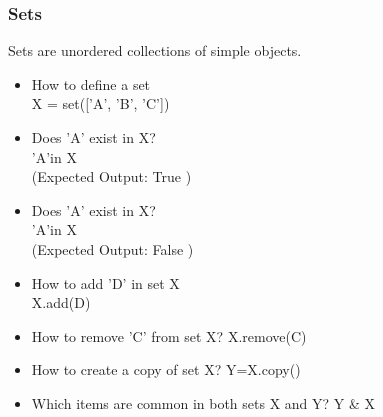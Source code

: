 \documentclass{beamer}
\theoremstyle{plain}
\theoremstyle{definition}
\begin{document}
\begin{frame}
 \frametitle{Sets}
      Sets are unordered collections of simple objects.
                        \begin{itemize}
                        \item How to define a set \\
                        X = set(['A', 'B', 'C']) \\
                        \item Does 'A' exist in X? \\
                        'A'in X \\
                        (Expected Output: True ) \\
                        \item Does 'A' exist in X? \\
                        'A'in X \\
                        (Expected Output: False ) \\
                        \item How to add 'D' in set X \\
                        X.add(D) \\
                        \item How to remove 'C' from set X?
                        X.remove(C) \\
                        \item How to create a copy of set X?
            Y=X.copy() \\
            \item Which items are common in both sets X and Y? Y \& X
     \end{itemize}
 \end{frame}
			
			
			
      
\end{document}
